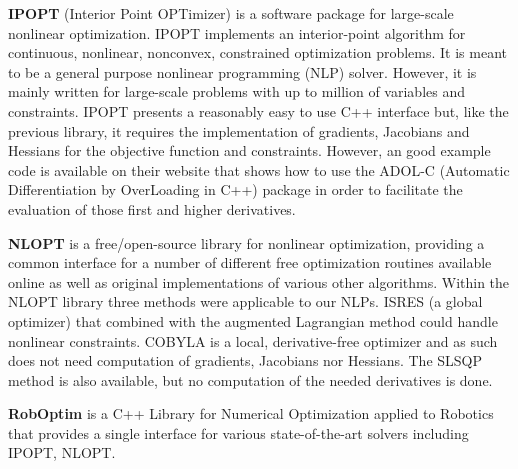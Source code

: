 \textbf{IPOPT} (Interior Point OPTimizer) is a software package for large-scale nonlinear optimization. IPOPT implements an interior-point algorithm for continuous, nonlinear, nonconvex, constrained optimization problems. It is meant to be a general purpose nonlinear programming (NLP) solver. However, it is mainly written for large-scale problems with up to million of variables and constraints. IPOPT presents a reasonably easy to
use C++ interface but, like the previous library, it requires the implementation of gradients, Jacobians and Hessians for the objective function and constraints. However, an good example code is available on their website that shows how to use the ADOL-C (Automatic Differentiation by OverLoading in C++) package in order to facilitate the evaluation of those first and higher derivatives.

\textbf{NLOPT} is a free/open-source library for nonlinear optimization, providing a common interface for a number of different free optimization routines available online as well as original implementations of various other algorithms. Within the NLOPT library three methods were applicable
to our NLPs. ISRES (a global optimizer) that combined with the augmented Lagrangian method could handle nonlinear constraints. COBYLA is a local, derivative-free optimizer and as such does not need computation of gradients, Jacobians nor Hessians. The SLSQP method is also available, but no computation of the needed derivatives is done.

\textbf{RobOptim} is a C++ Library for Numerical Optimization applied to Robotics that provides a single interface for various state-of-the-art solvers including IPOPT, NLOPT.


% 
%
%
%
% 




